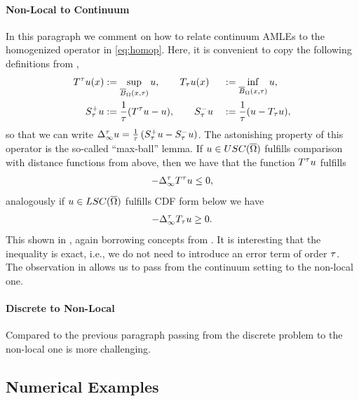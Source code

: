 \paragraph{Non-Local to Continuum}
%
In this paragraph we comment on how to relate continuum AMLEs to the homogenized operator in \cref{eq:homop}. Here, it is convenient to copy the following definitions from \cite{bungert2021uniform},
%
\begin{alignat}{2}
\label{eq:T-operators}
T^\tau u(x) &:= \sup_{\overline{B}_\Omega(x,\tau)} u, 
\qquad
T_\tau u(x) &&:= \inf_{\overline{B}_\Omega(x,\tau)} u,
\\
\label{eq:slopes}
S_\tau^+ u &:= \frac{1}{\tau}(T^\tau u - u),
\qquad
S_\tau^- u &&:= \frac{1}{\tau}(u-T_\tau u),
\end{alignat}
%
so that we can write $\Delta_\infty^\tau u = \frac{1}{\tau}\left(S^+_\tau u - S^-_\tau u\right)$. The astonishing property of this operator is the so-called \enquote{max-ball} lemma. If $u\in USC(\overline{\Omega})$ fulfills comparison with distance functions from above, then we have that the function $T^\tau u$ fulfills
%
\begin{align*}
-\Delta^\tau_\infty T^\tau u \leq 0,
\end{align*}
%
analogously if $u\in LSC(\overline{\Omega})$ fulfills CDF form below we have
%
\begin{align*}
-\Delta^\tau_\infty T_\tau u \geq 0.
\end{align*}
%
This shown in \cite[Lem. 4.6]{bungert2021uniform}, again borrowing concepts from \cite{armstrong2010easy}. It is interesting that the inequality is exact, i.e., we do not need to introduce an error term of order $\tau$. The observation in \cite[Lem. 4.6]{bungert2021uniform} allows us to pass from the continuum setting to the non-local one.
%
%
\paragraph{Discrete to Non-Local} Compared to the previous paragraph passing from the discrete problem to the non-local one is more challenging.

\subsection{Numerical Examples}
%
%
%
%
%

